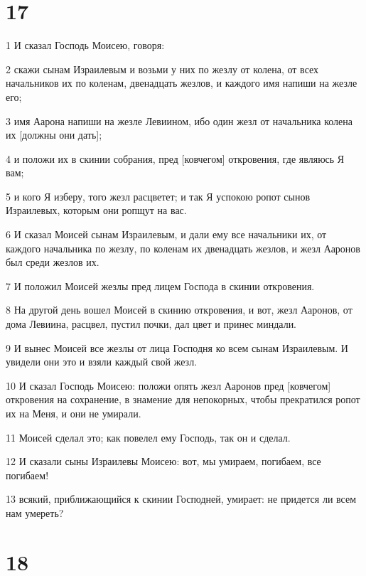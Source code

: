 \chapter{17}

\par 1 И сказал Господь Моисею, говоря:
\par 2 скажи сынам Израилевым и возьми у них по жезлу от колена, от всех начальников их по коленам, двенадцать жезлов, и каждого имя напиши на жезле его;
\par 3 имя Аарона напиши на жезле Левиином, ибо один жезл от начальника колена их [должны они дать];
\par 4 и положи их в скинии собрания, пред [ковчегом] откровения, где являюсь Я вам;
\par 5 и кого Я изберу, того жезл расцветет; и так Я успокою ропот сынов Израилевых, которым они ропщут на вас.
\par 6 И сказал Моисей сынам Израилевым, и дали ему все начальники их, от каждого начальника по жезлу, по коленам их двенадцать жезлов, и жезл Ааронов был среди жезлов их.
\par 7 И положил Моисей жезлы пред лицем Господа в скинии откровения.
\par 8 На другой день вошел Моисей в скинию откровения, и вот, жезл Ааронов, от дома Левиина, расцвел, пустил почки, дал цвет и принес миндали.
\par 9 И вынес Моисей все жезлы от лица Господня ко всем сынам Израилевым. И увидели они это и взяли каждый свой жезл.
\par 10 И сказал Господь Моисею: положи опять жезл Ааронов пред [ковчегом] откровения на сохранение, в знамение для непокорных, чтобы прекратился ропот их на Меня, и они не умирали.
\par 11 Моисей сделал это; как повелел ему Господь, так он и сделал.
\par 12 И сказали сыны Израилевы Моисею: вот, мы умираем, погибаем, все погибаем!
\par 13 всякий, приближающийся к скинии Господней, умирает: не придется ли всем нам умереть?

\chapter{18}

